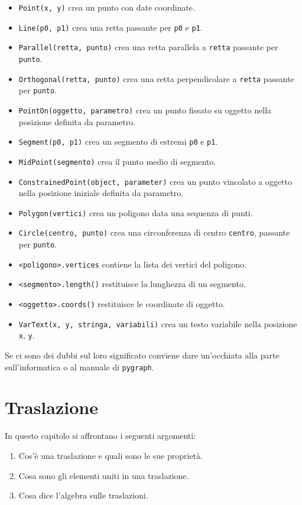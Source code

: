 \begin{itemize} [nosep]
\item \texttt{Point(x, y)} crea un punto con date coordinate.
\item \texttt{Line(p0, p1)} crea una retta passante per \texttt{p0} 
 e \texttt{p1}.
\item \texttt{Parallel(retta, punto)} crea una retta parallela a \texttt{retta}
 passante per \texttt{punto}.
\item \texttt{Orthogonal(retta, punto)} crea una retta perpendicolare 
a \texttt{retta} passante per \texttt{punto}.
\item \texttt{PointOn(oggetto, parametro)} crea un punto fissato su oggetto 
nella posizione definita da parametro.
\item \texttt{Segment(p0, p1)} crea un segmento di estremi \texttt{p0} e 
\texttt{p1}.
\item \texttt{MidPoint(segmento)} crea il punto medio di segmento.
\item \texttt{ConstrainedPoint(object, parameter)} crea un punto vincolato a 
oggetto
nella posizione iniziale definita da parametro.
\item \texttt{Polygon(vertici)} crea un poligono data una sequenza di punti.
\item \texttt{Circle(centro, punto)} crea una circonferenza di centro 
\texttt{centro},
passante per \texttt{punto}.
\item \texttt{\textless{}poligono\textgreater{}.vertices} contiene la lista dei 
vertici del poligono.
\item \texttt{\textless{}segmento\textgreater{}.length()} restituisce la 
lunghezza di un segmento.
\item \texttt{\textless{}oggetto\textgreater{}.coords()} restituisce le 
coordinate di oggetto.
\item \texttt{VarText(x, y, stringa, variabili)} crea un testo variabile nella
posizione \texttt{x}, \texttt{y}.
\end{itemize}

Se ci sono dei dubbi sul loro significato conviene dare un'occhiata alla
parte sull'informatica o al manuale di \texttt{pygraph}.


\section{Traslazione}
\label{sec:traslazione}

In questo capitolo si affrontano i seguenti argomenti:
\begin{enumerate} [noitemsep]
\item Cos'è una traslazione e quali sono le sue proprietà.
\item Cosa sono gli elementi uniti in una traslazione.
\item Cosa dice l'algebra sulle traslazioni.
\end{enumerate}

